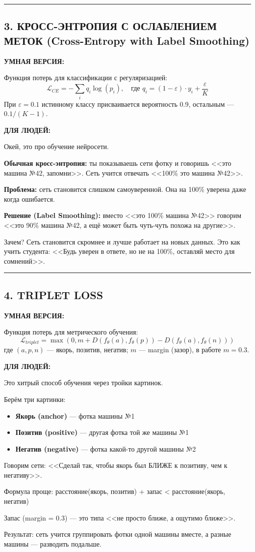 \documentclass[12pt,a4paper]{article}
\newcommand{\term}[3]{
\noindent\rule{\textwidth}{1pt}
\subsection*{#1}

\textcolor{smartgreen}{\textbf{УМНАЯ ВЕРСИЯ:}}

#2

\vspace{0.5em}
\textcolor{simpleblue}{\textbf{ДЛЯ ЛЮДЕЙ:}}

#3

\vspace{1em}
}
\begin{document}
\term{3. КРОСС-ЭНТРОПИЯ С ОСЛАБЛЕНИЕМ МЕТОК (Cross-Entropy with Label Smoothing)}
{Функция потерь для классификации с регуляризацией:
\[
\mathcal{L}_{CE} = -\sum_{i} q_i \log(p_i), \quad \text{где } q_i = (1-\varepsilon) \cdot y_i + \frac{\varepsilon}{K}
\]
При $\varepsilon=0.1$ истинному классу присваивается вероятность 0.9, остальным — $0.1/(K-1)$.}
{Окей, это про обучение нейросети.

\textbf{Обычная кросс-энтропия:} ты показываешь сети фотку и говоришь <<это машина №42, запомни>>. Сеть учится отвечать <<100\% это машина №42>>.

\textbf{Проблема:} сеть становится слишком самоуверенной. Она на 100\% уверена даже когда ошибается.

\textbf{Решение (Label Smoothing):} вместо <<это 100\% машина №42>> говорим <<это 90\% машина №42, а ещё может быть чуть-чуть похожа на другие>>.

Зачем? Сеть становится скромнее и лучше работает на новых данных. Это как учить студента: <<Будь уверен в ответе, но не на 100\%, оставляй место для сомнений>>.}

\term{4. TRIPLET LOSS}
{Функция потерь для метрического обучения:
\[
\mathcal{L}_{triplet} = \max\left(0, m + D(f_\theta(a), f_\theta(p)) - D(f_\theta(a), f_\theta(n))\right)
\]
где $(a, p, n)$ — якорь, позитив, негатив; $m$ — margin (зазор), в работе $m=0.3$.}
{Это хитрый способ обучения через тройки картинок.

Берём три картинки:
\begin{itemize}
\item \textbf{Якорь (anchor)} — фотка машины №1
\item \textbf{Позитив (positive)} — другая фотка той же машины №1
\item \textbf{Негатив (negative)} — фотка какой-то другой машины №2
\end{itemize}

Говорим сети: <<Сделай так, чтобы якорь был БЛИЖЕ к позитиву, чем к негативу>>.

Формула проще: расстояние(якорь, позитив) + запас < расстояние(якорь, негатив)

Запас (margin = 0.3) — это типа <<не просто ближе, а ощутимо ближе>>.

Результат: сеть учится группировать фотки одной машины вместе, а разные машины — разводить подальше.}
\end{document}
